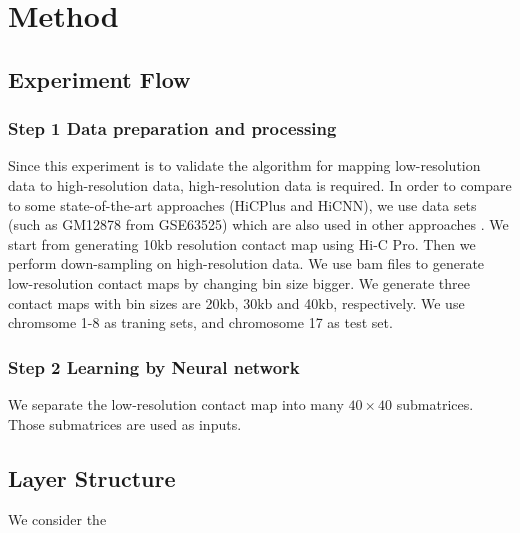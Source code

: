 \section{Method}
\subsection{Experiment Flow}
\subsubsection*{Step 1 Data preparation and processing}
Since this experiment is to validate the algorithm for mapping low-resolution data to high-resolution data, high-resolution data is required. In order to compare to some state-of-the-art approaches (HiCPlus and HiCNN), we use data sets (such as GM12878 from GSE63525) which are also used in other approaches . We start from generating 10kb resolution contact map using Hi-C Pro. Then we perform down-sampling on high-resolution data. We use bam files to generate low-resolution contact maps by changing bin size bigger. We generate three contact maps with bin sizes are 20kb, 30kb and 40kb, respectively. We use chromsome 1-8 as traning sets, and chromosome 17 as test set.
\subsubsection*{Step 2 Learning by Neural network}
We separate the low-resolution contact map into many $40 \times 40$ submatrices. Those submatrices are used as inputs.
\subsection{Layer Structure}
We consider the 